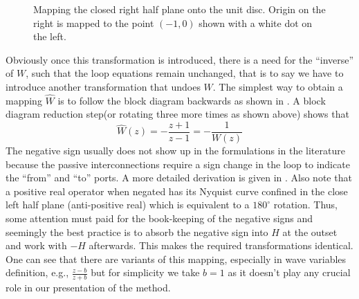 \begin{figure}%
\centering
{}
\caption[Mapping the closed right half plane onto the unit disc.]%
{Mapping the closed right half plane onto the unit disc. Origin on the right is mapped to the point $(-1,0)$ shown with a white dot on the left.}%
\label{fig:lit:smith}%
\end{figure}

Obviously once this transformation is introduced, there is a need for the ``inverse'' of $W$, such that the
loop equations remain unchanged, that is to say we have to introduce another transformation that undoes
$W$. The simplest way to obtain a mapping $\hat{W}$ is to follow the block diagram backwards as shown in 
. A block diagram reduction step(or rotating three more times as shown above) shows that 
\[
\hat{W}(z) = -\frac{z+1}{z-1} = -\frac{1}{W(z)}
\]
The negative sign usually does not show up in the formulations in the literature because the passive interconnections 
require a sign change in the loop to indicate the ``from'' and ``to'' ports. A more detailed derivation
is given in \cite{colgate3}. Also note that a positive real operator when negated has its Nyquist curve 
confined in the close left half plane (anti-positive real) which is equivalent to a $180^\circ$ rotation. 
Thus, some attention must paid for the book-keeping of the negative signs and seemingly the best practice
is to absorb the negative sign into $H$ at the outset and work with $-H$ afterwards. This makes the required
transformations identical. One can see that there are variants of this mapping, especially in wave variables 
definition, e.g., $\frac{z-b}{z+b}$ but for simplicity we take $b=1$ as it doesn't play any crucial role 
in our presentation of the method. 


